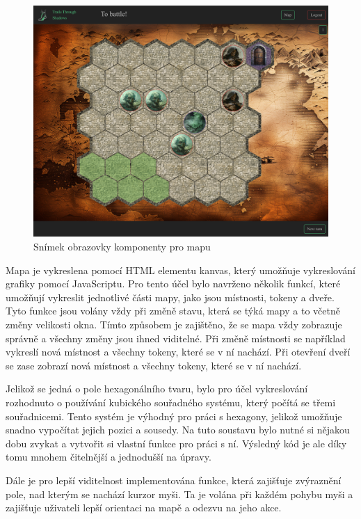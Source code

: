 \begin{figure}[H]
  \centering
  \includegraphics[width=.95\textwidth]{resources/figures/TTS-Map.png}
  \caption{Snímek obrazovky komponenty pro mapu}
  \label{fig:map}
\end{figure}

Mapa je vykreslena pomocí HTML elementu kanvas, který umožňuje vykreslování grafiky pomocí JavaScriptu. Pro tento účel bylo navrženo několik funkcí, které umožňují vykreslit jednotlivé části mapy, jako jsou místnosti, tokeny a dveře. Tyto funkce jsou volány vždy při změně stavu, která se týká mapy a to včetně změny velikosti okna. Tímto způsobem je zajištěno, že se mapa vždy zobrazuje správně a všechny změny jsou ihned viditelné. Při změně místnosti se například vykreslí nová místnost a všechny tokeny, které se v ní nachází. Při otevření dveří se zase zobrazí nová místnost a všechny tokeny, které se v ní nachází. 

Jelikož se jedná o pole hexagonálního tvaru, bylo pro účel vykreslování rozhodnuto o používání kubického souřadného systému, který počítá se třemi souřadnicemi. Tento systém je výhodný pro práci s hexagony, jelikož umožňuje snadno vypočítat jejich pozici a sousedy. Na tuto soustavu bylo nutné si nějakou dobu zvykat a vytvořit si vlastní funkce pro práci s ní. Výsledný kód je ale díky tomu mnohem čitelnější a jednodušší na úpravy.

Dále je pro lepší viditelnost implementována funkce, která zajišťuje zvýraznění pole, nad kterým se nachází kurzor myši. Ta je volána při každém pohybu myši a zajišťuje uživateli lepší orientaci na mapě a odezvu na jeho akce.

